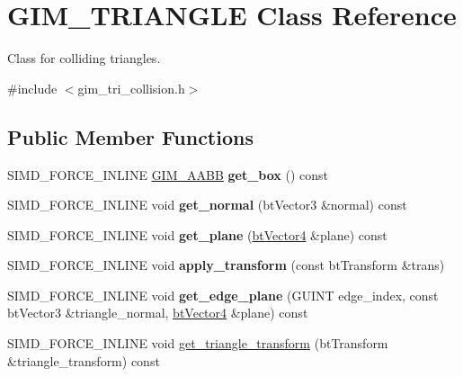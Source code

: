 \hypertarget{classGIM__TRIANGLE}{}\section{G\+I\+M\+\_\+\+T\+R\+I\+A\+N\+G\+LE Class Reference}
\label{classGIM__TRIANGLE}


Class for colliding triangles.  




{\ttfamily \#include $<$gim\+\_\+tri\+\_\+collision.\+h$>$}

\subsection*{Public Member Functions}
\begin{DoxyCompactItemize}
\item 
\mbox{\label{classGIM__TRIANGLE_acbe4f54e9838827ca7341d4caeb18fcc}} 
S\+I\+M\+D\+\_\+\+F\+O\+R\+C\+E\+\_\+\+I\+N\+L\+I\+NE \hyperlink{classGIM__AABB}{G\+I\+M\+\_\+\+A\+A\+BB} {\bfseries get\+\_\+box} () const
\item 
\mbox{\label{classGIM__TRIANGLE_a72f96413abaeca198cc013800b1b2c7d}} 
S\+I\+M\+D\+\_\+\+F\+O\+R\+C\+E\+\_\+\+I\+N\+L\+I\+NE void {\bfseries get\+\_\+normal} (bt\+Vector3 \&normal) const
\item 
\mbox{\label{classGIM__TRIANGLE_a57e15b754d9a2af873dd0655abe12410}} 
S\+I\+M\+D\+\_\+\+F\+O\+R\+C\+E\+\_\+\+I\+N\+L\+I\+NE void {\bfseries get\+\_\+plane} (\hyperlink{classbtVector4}{bt\+Vector4} \&plane) const
\item 
\mbox{\label{classGIM__TRIANGLE_ab118892e21f9683a91207072ada1d179}} 
S\+I\+M\+D\+\_\+\+F\+O\+R\+C\+E\+\_\+\+I\+N\+L\+I\+NE void {\bfseries apply\+\_\+transform} (const bt\+Transform \&trans)
\item 
\mbox{\label{classGIM__TRIANGLE_a63a2c22d4532c93c5270d7f4216dbf12}} 
S\+I\+M\+D\+\_\+\+F\+O\+R\+C\+E\+\_\+\+I\+N\+L\+I\+NE void {\bfseries get\+\_\+edge\+\_\+plane} (G\+U\+I\+NT edge\+\_\+index, const bt\+Vector3 \&triangle\+\_\+normal, \hyperlink{classbtVector4}{bt\+Vector4} \&plane) const
\item 
S\+I\+M\+D\+\_\+\+F\+O\+R\+C\+E\+\_\+\+I\+N\+L\+I\+NE void \hyperlink{classGIM__TRIANGLE_a45e2c6e131c368afa12e210cf9166fbb}{get\+\_\+triangle\+\_\+transform} (bt\+Transform \&triangle\+\_\+transform) const

\end{DoxyCompactItemize}
